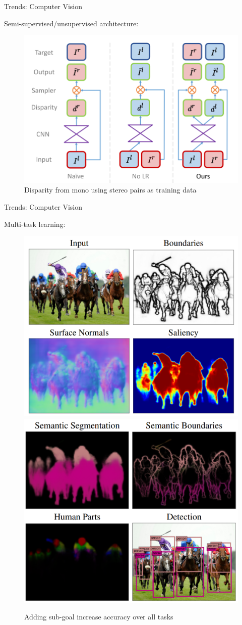 \begin{frame}{Trends: Computer Vision}

	Semi-supervised/unsupervised architecture:
	
	\begin{figure}
		\includegraphics[width=0.7\linewidth]{images/unsupervised.png}
		\caption{Disparity from mono using stereo pairs as training data~\cite{UNSUPERVISED}}
	\end{figure}

\end{frame}

\begin{frame}{Trends: Computer Vision}

	Multi-task learning:
	
	\begin{figure}
		\includegraphics[width=0.45\linewidth]{images/ubernet1.png}
		\includegraphics[width=0.44\linewidth]{images/ubernet2.png}
		\caption{Adding sub-goal increase accuracy over all tasks~\cite{UBERNET}}
	\end{figure}

	

\end{frame}

